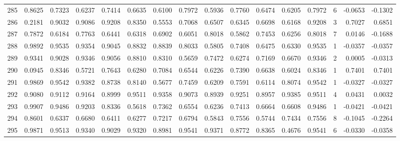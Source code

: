 \begin{tabular}{lrrrrrrrrrrrrrrr}
285 &      0.8625 &  0.7323 &  0.6237 &  0.7414 &  0.6635 &  0.6100 &  0.7972 &  0.5936 &  0.7760 &  0.6474 &   0.6205 &     0.7972 &      6 &                   -0.0653 &                    -0.1302 \\
286 &      0.2181 &  0.9032 &  0.9086 &  0.9208 &  0.8350 &  0.5553 &  0.7068 &  0.6507 &  0.6345 &  0.6698 &   0.6168 &     0.9208 &      3 &                    0.7027 &                     0.6851 \\
287 &      0.7872 &  0.6184 &  0.7763 &  0.6441 &  0.6318 &  0.6902 &  0.6051 &  0.8018 &  0.5862 &  0.7453 &   0.6256 &     0.8018 &      7 &                    0.0146 &                    -0.1688 \\
288 &      0.9892 &  0.9535 &  0.9354 &  0.9045 &  0.8832 &  0.8839 &  0.8033 &  0.5805 &  0.7408 &  0.6475 &   0.6330 &     0.9535 &      1 &                   -0.0357 &                    -0.0357 \\
289 &      0.9341 &  0.9028 &  0.9346 &  0.9056 &  0.8810 &  0.8310 &  0.5659 &  0.7472 &  0.6274 &  0.7169 &   0.6670 &     0.9346 &      2 &                    0.0005 &                    -0.0313 \\
290 &      0.0945 &  0.8346 &  0.5721 &  0.7643 &  0.6280 &  0.7084 &  0.6544 &  0.6226 &  0.7390 &  0.6638 &   0.6024 &     0.8346 &      1 &                    0.7401 &                     0.7401 \\
291 &      0.9869 &  0.9542 &  0.9382 &  0.8738 &  0.8140 &  0.5677 &  0.7459 &  0.6209 &  0.7591 &  0.6114 &   0.8074 &     0.9542 &      1 &                   -0.0327 &                    -0.0327 \\
292 &      0.9080 &  0.9112 &  0.9164 &  0.8999 &  0.9511 &  0.9358 &  0.9073 &  0.8939 &  0.9251 &  0.8957 &   0.9385 &     0.9511 &      4 &                    0.0431 &                     0.0032 \\
293 &      0.9907 &  0.9486 &  0.9203 &  0.8336 &  0.5618 &  0.7362 &  0.6554 &  0.6236 &  0.7413 &  0.6664 &   0.6608 &     0.9486 &      1 &                   -0.0421 &                    -0.0421 \\
294 &      0.8601 &  0.6337 &  0.6680 &  0.6411 &  0.6277 &  0.7217 &  0.6794 &  0.5843 &  0.7556 &  0.5744 &   0.7434 &     0.7556 &      8 &                   -0.1045 &                    -0.2264 \\
295 &      0.9871 &  0.9513 &  0.9340 &  0.9029 &  0.9320 &  0.8981 &  0.9541 &  0.9371 &  0.8772 &  0.8365 &   0.4676 &     0.9541 &      6 &                   -0.0330 &                    -0.0358 \\

\end{tabular}
